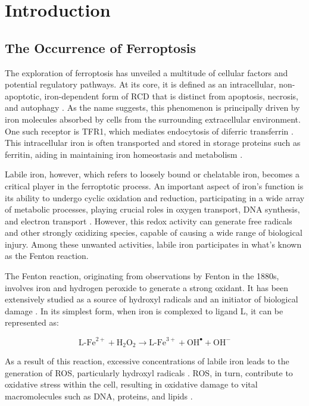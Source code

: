 \chapter[Introduction]%
{Introduction}

\section{The Occurrence of Ferroptosis}

The exploration of ferroptosis has unveiled a multitude of cellular factors and potential regulatory pathways. At its core, it is defined as an intracellular, non-apoptotic, iron-dependent form of \ac{RCD} that is distinct from apoptosis, necrosis, and autophagy \citep{ferro_cd}. As the name suggests, this phenomenon is principally driven by iron molecules absorbed by cells from the surrounding extracellular environment. One such receptor is \ac{TFR1}, which mediates endocytosis of diferric transferrin \citep{tfr1}. This intracellular iron is often transported and stored in storage proteins such as ferritin, aiding in maintaining iron homeostasis and metabolism \citep{ferritin}.

Labile iron, however, which refers to loosely bound or chelatable iron, becomes a critical player in the ferroptotic process. An important aspect of iron's function is its ability to undergo cyclic oxidation and reduction, 
participating in a wide array of metabolic processes, playing crucial roles in oxygen transport, DNA synthesis, and electron transport \citep{iron_importance}. However, this redox activity can generate free radicals and other strongly oxidizing species, capable of causing a wide range of biological injury. Among these unwanted activities, labile iron participates in what's known as the Fenton reaction.

The Fenton reaction, originating from observations by Fenton in the 1880s, involves iron and hydrogen peroxide to generate a strong oxidant. It has been extensively studied as a source of hydroxyl radicals and an initiator of biological damage \citep{fenton2}. In its simplest form, when iron is complexed to ligand L, it can be represented as:

\[
\text{L-Fe}^{2+} + \text{H}_2\text{O}_2 \rightarrow \text{L-Fe}^{3+} + \text{OH}^• + \text{OH}^-
\]

As a result of this reaction, excessive concentrations of labile iron leads to the generation of \ac{ROS}, particularly hydroxyl radicals \citep{labile_iron}. \ac{ROS}, in turn, contribute to oxidative stress within the cell, resulting in oxidative damage to vital macromolecules such as DNA, proteins, and lipids \citep{oxidative_stress}. 

